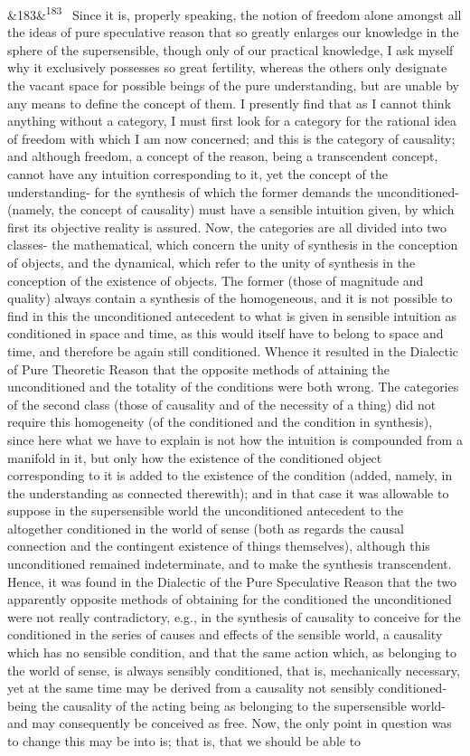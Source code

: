 \documentclass[12pt]{article}
\newcommand{\para}[1][]{\par\noindent\ifx&#1&\else\textsuperscript{\footnotesize #1}~\fi}
\begin{document}
\para[183] Since it is, properly speaking, the notion of freedom alone amongst all the ideas of pure speculative reason that so greatly enlarges our knowledge in the sphere of the supersensible, though only of our practical knowledge, I ask myself why it exclusively possesses so great fertility, whereas the others only designate the vacant space for possible beings of the pure understanding, but are unable by any means to define the concept of them. I presently find that as I cannot think anything without a category, I must first look for a category for the rational idea of freedom with which I am now concerned; and this is the category of causality; and although freedom, a concept of the reason, being a transcendent concept, cannot have any intuition corresponding to it, yet the concept of the understanding- for the synthesis of which the former demands the unconditioned- (namely, the concept of causality) must have a sensible intuition given, by which first its objective reality is assured. Now, the categories are all divided into two classes- the mathematical, which concern the unity of synthesis in the conception of objects, and the dynamical, which refer to the unity of synthesis in the conception of the existence of objects. The former (those of magnitude and quality) always contain a synthesis of the homogeneous, and it is not possible to find in this the unconditioned antecedent to what is given in sensible intuition as conditioned in space and time, as this would itself have to belong to space and time, and therefore be again still conditioned. Whence it resulted in the Dialectic of Pure Theoretic Reason that the opposite methods of attaining the unconditioned and the totality of the conditions were both wrong. The categories of the second class (those of causality and of the necessity of a thing) did not require this homogeneity (of the conditioned and the condition in synthesis), since here what we have to explain is not how the intuition is compounded from a manifold in it, but only how the existence of the conditioned object corresponding to it is added to the existence of the condition (added, namely, in the understanding as connected therewith); and in that case it was allowable to suppose in the supersensible world the unconditioned antecedent to the altogether conditioned in the world of sense (both as regards the causal connection and the contingent existence of things themselves), although this unconditioned remained indeterminate, and to make the synthesis transcendent. Hence, it was found in the Dialectic of the Pure Speculative Reason that the two apparently opposite methods of obtaining for the conditioned the unconditioned were not really contradictory, e.g., in the synthesis of causality to conceive for the conditioned in the series of causes and effects of the sensible world, a causality which has no sensible condition, and that the same action which, as belonging to the world of sense, is always sensibly conditioned, that is, mechanically necessary, yet at the same time may be derived from a causality not sensibly conditioned- being the causality of the acting being as belonging to the supersensible world- and may consequently be conceived as free. Now, the only point in question was to change this may be into is; that is, that we should be able to 
\end{document}
